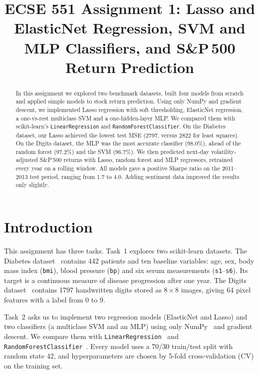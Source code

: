 \documentclass[conference]{IEEEtran}
\begin{document}
\title{ECSE 551 Assignment 1: Lasso and ElasticNet Regression, SVM and MLP Classifiers, and S\&P\,500 Return Prediction}

\author{
}

\maketitle

\begin{abstract}
In this assignment we explored two benchmark datasets, built four models from scratch and applied simple models to stock return prediction. Using only NumPy and gradient descent, we implemented Lasso regression with soft thresholding, ElasticNet regression, a one-vs-rest multiclass SVM and a one-hidden-layer MLP. We compared them with scikit-learn's \texttt{LinearRegression} and \texttt{RandomForestClassifier}. On the Diabetes dataset, our Lasso achieved the lowest test MSE (2797, versus 2822 for least squares). On the Digits dataset, the MLP was the most accurate classifier (98.0\%), ahead of the random forest (97.2\%) and the SVM (96.7\%). We then predicted next-day volatility-adjusted S\&P\,500 returns with Lasso, random forest and MLP regressors, retrained every year on a rolling window. All models gave a positive Sharpe ratio on the 2011--2013 test period, ranging from 1.7 to 4.0. Adding sentiment data improved the results only slightly.
\end{abstract}

\section{Introduction}
This assignment has three tasks. Task~1 explores two scikit-learn datasets. The Diabetes dataset~\cite{skDiab} contains 442 patients and ten baseline variables: age, sex, body mass index (\texttt{bmi}), blood pressure (\texttt{bp}) and six serum measurements (\texttt{s1}--\texttt{s6}). Its target is a continuous measure of disease progression after one year. The Digits dataset~\cite{skDig} contains 1797 handwritten digits stored as $8\times8$ images, giving 64 pixel features with a label from 0 to 9.

Task~2 asks us to implement two regression models (ElasticNet and Lasso) and two classifiers (a multiclass SVM and an MLP) using only NumPy~\cite{numpy} and gradient descent. We compare them with \texttt{LinearRegression}~\cite{skLinReg} and \texttt{RandomForestClassifier}~\cite{skRF}. Every model uses a 70/30 train/test split with random state 42, and hyperparameters are chosen by 5-fold cross-validation (CV) on the training set.
\end{document}
